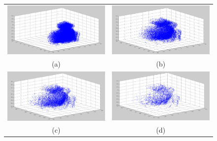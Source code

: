\documentclass[11pt,a4paper]{article}
\begin{document}
\begin{figure}
\centering
\begin{tabular}{cc}
\includegraphics[width=.49\textwidth,height=.49\textwidth]{graphs/tot1.png} &
\includegraphics[width=.49\textwidth,height=.49\textwidth]{graphs/tot2.png} \\ (a) & (b) \\
\includegraphics[width=.49\textwidth,height=.49\textwidth]{graphs/tot4.png} &
\includegraphics[width=.49\textwidth,height=.49\textwidth]{graphs/tot10.png} \\ (c) & (d)

\end{tabular}
\end{figure}
\end{document}
